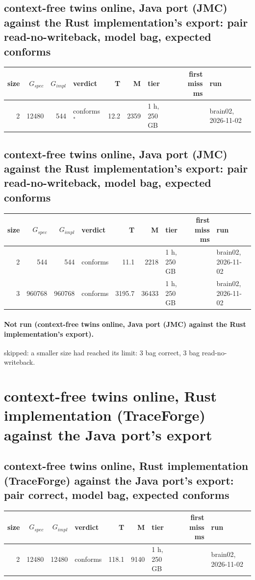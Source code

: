 \documentclass[10pt]{article}
\begin{document}
\subsection*{context-free twins online, Java port (JMC) against the Rust implementation's export: pair \textsf{read-no-writeback}, model bag, expected conforms}
\begin{longtable}{@{}rrrlrrlrl@{}}
\toprule
size & $G_{\mathit{spec}}$ & $G_{\mathit{impl}}$ & verdict & T & M & tier & first miss ms & run \\
\midrule
\endhead
\color{red} 2 & 12480 & 544 & conforms$^{\ast}$ & 12.2 & 2359 & 1 h, 250 GB &  & brain02, 2026-11-02 \\
\bottomrule
\end{longtable}
\subsection*{context-free twins online, Java port (JMC) against the Rust implementation's export: pair \textsf{read-no-writeback}, model bag, expected conforms}
\begin{longtable}{@{}rrrlrrlrl@{}}
\toprule
size & $G_{\mathit{spec}}$ & $G_{\mathit{impl}}$ & verdict & T & M & tier & first miss ms & run \\
\midrule
\endhead
\color{red} 2 & 544 & 544 & conforms & 11.1 & 2218 & 1 h, 250 GB &  & brain02, 2026-11-02 \\
\color{red} 3 & 960768 & 960768 & conforms & 3195.7 & 36433 & 1 h, 250 GB &  & brain02, 2026-11-02 \\
\bottomrule
\end{longtable}
\paragraph{Not run (context-free twins online, Java port (JMC) against the Rust implementation's export).}
skipped: a smaller size had reached its limit: 3 bag correct, 3 bag read-no-writeback.\par
\section*{context-free twins online, Rust implementation (TraceForge) against the Java port's export}
\subsection*{context-free twins online, Rust implementation (TraceForge) against the Java port's export: pair \textsf{correct}, model bag, expected conforms}
\begin{longtable}{@{}rrrlrrlrl@{}}
\toprule
size & $G_{\mathit{spec}}$ & $G_{\mathit{impl}}$ & verdict & T & M & tier & first miss ms & run \\
\midrule
\endhead
\color{red} 2 & 12480 & 12480 & conforms & 118.1 & 9140 & 1 h, 250 GB &  & brain02, 2026-11-02 \\
\bottomrule
\end{longtable}
\end{document}
